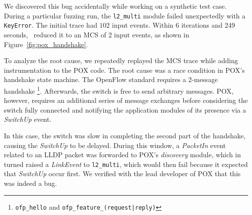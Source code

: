  We discovered this bug accidentally
while working on a synthetic test case. During a particular fuzzing run, the
\verb=l2_multi= module failed unexpectedly with a \verb=KeyError=. The initial trace
had $102$ input events. Within 6 iterations and 249 seconds,
\projectname~reduced it to an MCS of 2 input events, as shown in
Figure~\ref{fig:pox_handshake}.

To analyze the root cause, we repeatedly replayed the MCS trace while adding
instrumentation to the POX code. The root cause was a race
condition in POX's handshake state machine. The OpenFlow standard
requires a 2-message handshake \footnote{\texttt{ofp\_hello} and
\texttt{ofp\_feature\_(request|reply)}}. Afterwards, the switch is free to send
arbitrary messages. POX, however, requires an additional series of message
exchanges before considering the switch fully connected and notifying the
application modules of its presence via a \emph{SwitchUp} event.

In this case, the switch was slow in completing the second part
of the handshake, causing the \emph{SwitchUp} to be delayed. During this window,
a \emph{PacketIn} event related to an LLDP packet was forwarded to POX's
\emph{discovery} module, which in turned raised a \emph{LinkEvent} to
\verb=l2_multi=, which would then fail because it expected that \emph{SwitchUp} occur first.
We verified with the lead developer of POX that this was indeed a bug.

